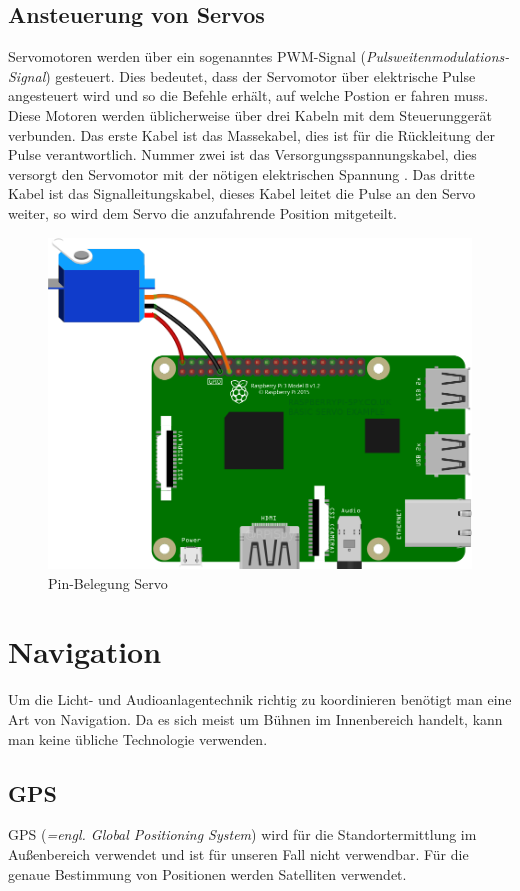 \subsection{Ansteuerung von Servos}
Servomotoren werden über ein sogenanntes PWM-Signal (\emph{Pulsweitenmodulations-Signal}) gesteuert. Dies bedeutet, dass der Servomotor über elektrische Pulse angesteuert wird und so die Befehle erhält, auf welche Postion er fahren muss. Diese Motoren werden üblicherweise über drei Kabeln mit dem Steuerunggerät verbunden. Das erste Kabel ist das Massekabel, dies ist für die Rückleitung der Pulse verantwortlich. Nummer zwei ist das Versorgungsspannungskabel, dies versorgt den Servomotor mit der nötigen elektrischen Spannung \textcite{ServomotorAnsteuerung}. Das dritte Kabel ist das Signalleitungskabel, dieses Kabel leitet die Pulse an den Servo weiter, so wird dem Servo die anzufahrende Position mitgeteilt.\\


\begin{figure}[H]
	\centering
	\includegraphics[width=0.7\linewidth]{images/Pin_Belegung.png}
	\caption[Pin-Belegung Servo]{Pin-Belegung Servo}
	\label{fig:PIN_Belegung}
\end{figure}

\section{Navigation}

Um die Licht- und Audioanlagentechnik richtig zu koordinieren benötigt man eine Art von Navigation. Da es sich meist um Bühnen im Innenbereich handelt, kann man keine übliche Technologie verwenden.


\subsection{GPS}
GPS (\emph{=engl. Global Positioning System}) \textcite{GPS} wird für die Standortermittlung im Außenbereich verwendet und ist für unseren Fall nicht verwendbar. Für die genaue Bestimmung von Positionen werden Satelliten verwendet.

